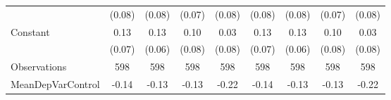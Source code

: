 {\begin{tabular}{l*{8}{c}}
                    &      (0.08)         &      (0.08)         &      (0.07)         &      (0.08)         &      (0.08)         &      (0.08)         &      (0.07)         &      (0.08)         \\
[1em]
Constant            &        0.13\sym{*}  &        0.13\sym{**} &        0.10         &        0.03         &        0.13\sym{*}  &        0.13\sym{**} &        0.10         &        0.03         \\
                    &      (0.07)         &      (0.06)         &      (0.08)         &      (0.08)         &      (0.07)         &      (0.06)         &      (0.08)         &      (0.08)         \\
\hline
Observations        &         598         &         598         &         598         &         598         &         598         &         598         &         598         &         598         \\
MeanDepVarControl   &       -0.14         &       -0.13         &       -0.13         &       -0.22         &       -0.14         &       -0.13         &       -0.13         &       -0.22         \\
\hline\hline
\end{tabular}
}

